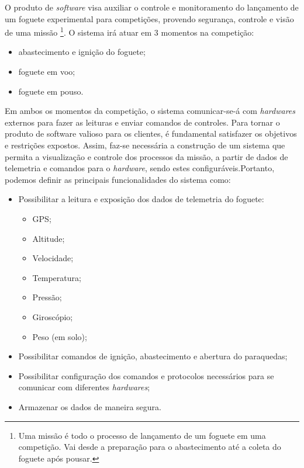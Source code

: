\par O produto de \textit{software} visa auxiliar o controle e monitoramento do lançamento de um foguete experimental para competições, provendo segurança, controle e visão de uma missão \footnote{Uma missão é todo o processo de lançamento de um foguete em uma competição. Vai desde a preparação para o abastecimento até a coleta do foguete após pousar.}. O sistema irá atuar em 3 momentos na competição:

\begin{itemize}
    \item abastecimento e ignição do foguete;
    \item foguete em voo;
    \item foguete em pouso.
\end{itemize}

\par Em ambos os momentos da competição, o sistema comunicar-se-á com \textit{hardwares} externos para fazer as leituras e enviar comandos de controles. Para tornar o produto de software valioso para os clientes, é fundamental satisfazer os objetivos e restrições expostos. Assim, faz-se necessária a construção de um sistema que permita a visualização e controle dos processos da missão, a partir de dados de telemetria e comandos para o \textit{hardware}, sendo estes configuráveis.Portanto, podemos definir as principais funcionalidades do sistema como:

\begin{itemize}
    \item Possibilitar a leitura e exposição dos dados de telemetria do foguete:
    \begin{itemize}
        \item GPS;
        \item Altitude;
        \item Velocidade;
        \item Temperatura;
        \item Pressão;
        \item Giroscópio;
        \item Peso (em solo); 
    \end{itemize}
    \item Possibilitar comandos de ignição, abastecimento e abertura do paraquedas;
    \item Possibilitar configuração dos comandos e protocolos necessários para se comunicar com diferentes \textit{hardwares};
    \item Armazenar os dados de maneira segura.
\end{itemize}

